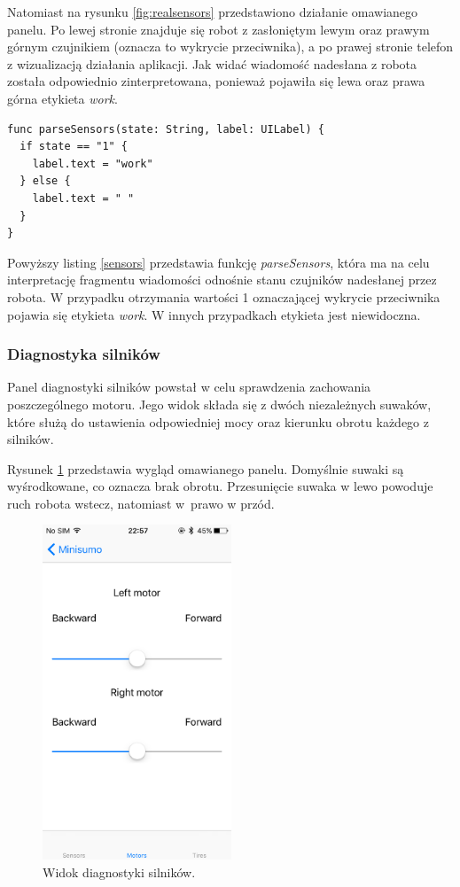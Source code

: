 Natomiast na rysunku \ref{fig:realsensors} przedstawiono działanie omawianego panelu. Po lewej stronie znajduje się robot z zasłoniętym lewym oraz prawym górnym czujnikiem (oznacza to wykrycie przeciwnika), a po prawej stronie telefon z wizualizacją działania aplikacji. Jak widać wiadomość nadesłana z robota została odpowiednio zinterpretowana, ponieważ pojawiła się lewa oraz prawa górna etykieta \textit{work}.

\begin{minipage}{\textwidth}
	\begin{lstlisting}[label=sensors,caption=Parsowanie wiadomości zawierającej stan czujników.]
func parseSensors(state: String, label: UILabel) {
  if state == "1" {
    label.text = "work"
  } else {
    label.text = " "
  }
}
	\end{lstlisting}
\end{minipage}

Powyższy listing \ref{sensors} przedstawia funkcję \textit{parseSensors}, która ma na celu interpretację fragmentu wiadomości odnośnie stanu czujników nadesłanej przez robota. W przypadku otrzymania wartości 1 oznaczającej wykrycie przeciwnika pojawia się etykieta \textit{work}. W innych przypadkach etykieta jest niewidoczna.
 
\subsubsection{Diagnostyka silników}
Panel diagnostyki silników powstał w celu sprawdzenia zachowania poszczególnego motoru. Jego widok składa się z dwóch niezależnych suwaków, które służą do ustawienia odpowiedniej mocy oraz kierunku obrotu każdego z silników.

Rysunek \ref{fig:motors} przedstawia wygląd omawianego panelu. Domyślnie suwaki są wyśrodkowane, co oznacza brak obrotu. Przesunięcie suwaka w lewo powoduje ruch robota wstecz, natomiast w~prawo w przód.

\begin{figure}[H]
	\centering
		\includegraphics[width=0.75\linewidth, height=10cm, keepaspectratio, fbox]{pic05/motors.PNG}
	\caption{Widok diagnostyki silników.}
	\label{fig:motors}	
\end{figure}

